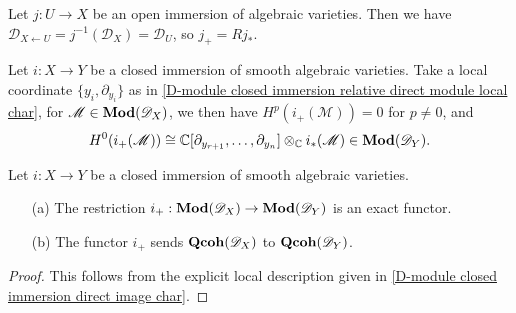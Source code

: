 \begin{example}\label{D-module open immersion direct image char}
Let $j:U\to X$ be an open immersion of algebraic varieties. Then we have $\mathscr{D}_{X\leftarrow U}=j^{-1}(\mathscr{D}_X)=\mathscr{D}_U$, so $j_+=Rj_*$.
\end{example}

\begin{example}\label{D-module closed immersion direct image char}
Let $i:X\to Y$ be a closed immersion of smooth algebraic varieties. Take a local coordinate $\{y_i,\partial_{y_i}\}$ as in \cref{D-module closed immersion relative direct module local char}, for $\mathscr{M}\in\mathbf{Mod}(\mathscr{D}_X)$, we then have $H^p(i_+(\mathscr{M}))=0$ for $p\neq 0$, and
\[H^0(i_+(\mathscr{M}))\cong \mathbb{C}[\partial_{y_{r+1}},\dots,\partial_{y_n}]\otimes_{\mathbb{C}}i_*(\mathscr{M})\in\mathbf{Mod}(\mathscr{D}_Y).\]
\end{example}

\begin{proposition}\label{D-module closed immersion direct image prop}
Let $i:X\to Y$ be a closed immersion of smooth algebraic varieties.
\begin{enumerate}
    \item[(a)] The restriction $i_+:\mathbf{Mod}(\mathscr{D}_X)\to\mathbf{Mod}(\mathscr{D}_Y)$ is an exact functor.
    \item[(b)] The functor $i_+$ sends $\mathbf{Qcoh}(\mathscr{D}_X)$ to $\mathbf{Qcoh}(\mathscr{D}_Y)$.
\end{enumerate}
\end{proposition}
\begin{proof}
This follows from the explicit local description given in \cref{D-module closed immersion direct image char}.
\end{proof}

